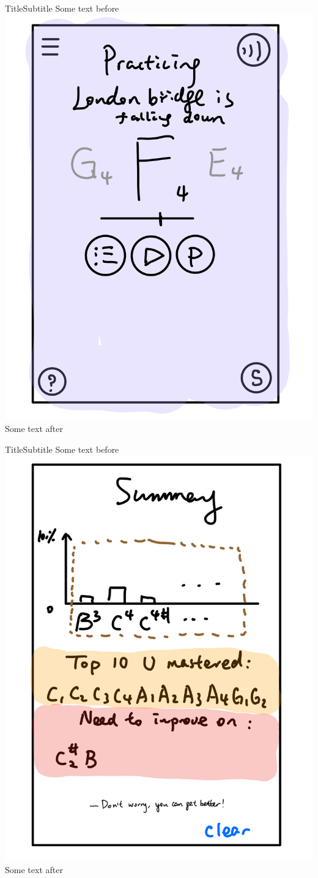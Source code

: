 \documentclass{beamer}
\begin{document}
\begin{frame}{Title}{Subtitle}
  Some text before
  \includegraphics[page=1,width=.5\textwidth] {./slides_separate/song-practice-practicing-london.pdf}
  Some text after
\end{frame}
\begin{frame}{Title}{Subtitle}
  Some text before
  \includegraphics[page=1,width=.5\textwidth] {./slides_separate/summary-section.pdf}
  Some text after
\end{frame}
\end{document}
